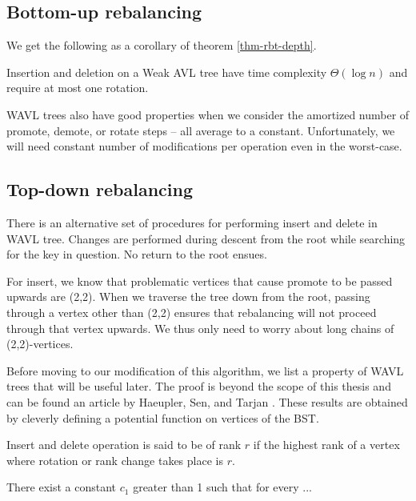 \subsection{Bottom-up rebalancing}








We get the following as a corollary of theorem \ref{thm-rbt-depth}.

\begin{prop}
Insertion and deletion on a Weak AVL tree have time complexity $\Theta(\log n)$ and require at most one rotation.
\end{prop}

WAVL trees also have good properties when we consider the amortized number of promote, demote, or rotate steps -- all average to a constant. Unfortunately, we will need constant number of modifications per operation even in the worst-case.

\subsection{Top-down rebalancing}

There is an alternative set of procedures for performing insert and delete in WAVL tree. Changes are performed during descent from the root while searching for the key in question. No return to the root ensues.

For insert, we know that problematic vertices that cause promote to be passed upwards are (2,2). When we traverse the tree down from the root, passing through a vertex other than (2,2) ensures that rebalancing will not proceed through that vertex upwards. We thus only need to worry about long chains of (2,2)-vertices.

Before moving to our modification of this algorithm, we list a property of WAVL trees that will be useful later. The proof is beyond the scope of this thesis and can be found an article by Haeupler, Sen, and Tarjan \cite{rank-balanced-trees}. These results are obtained by cleverly defining a potential function on vertices of the BST.

\begin{defn}
Insert and delete operation is said to be of rank $r$ if the highest rank of a vertex where rotation or rank change takes place is $r$.
\end{defn}

\begin{prop}
There exist a constant $c_1$ greater than 1 such that for every ... %
\end{prop}